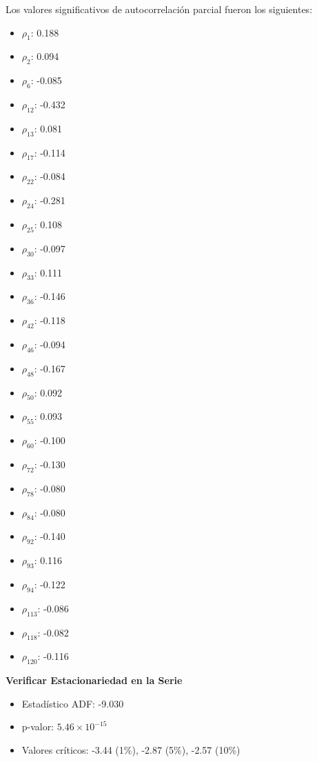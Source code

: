 \documentclass[12pt,letterpaper]{article}   %
\begin{document}
Los valores significativos de autocorrelación parcial fueron los siguientes:
\begin{multicols}{5}
\scriptsize
\begin{itemize}
    \item $\rho_1$: 0.188
    \item $\rho_2$: 0.094
    \item $\rho_6$: -0.085
    \item $\rho_{12}$: -0.432
    \item $\rho_{13}$: 0.081
    \item $\rho_{17}$: -0.114
    \item $\rho_{22}$: -0.084
    \item $\rho_{24}$: -0.281
    \item $\rho_{25}$: 0.108
    \item $\rho_{30}$: -0.097
    \item $\rho_{33}$: 0.111
    \item $\rho_{36}$: -0.146
    \item $\rho_{42}$: -0.118
    \item $\rho_{46}$: -0.094
    \item $\rho_{48}$: -0.167
    \item $\rho_{50}$: 0.092
    \item $\rho_{55}$: 0.093
    \item $\rho_{60}$: -0.100
    \item $\rho_{72}$: -0.130
    \item $\rho_{78}$: -0.080
    \item $\rho_{84}$: -0.080
    \item $\rho_{92}$: -0.140
    \item $\rho_{93}$: 0.116
    \item $\rho_{94}$: -0.122
    \item $\rho_{113}$: -0.086
    \item $\rho_{118}$: -0.082
    \item $\rho_{120}$: -0.116
\end{itemize}
\end{multicols}



\textbf{Verificar Estacionariedad en la Serie}



\begin{itemize}
    \item Estadístico ADF: -9.030
    \item p-valor: $5.46 \times 10^{-15}$
    \item Valores críticos: -3.44 (1\%), -2.87 (5\%), -2.57 (10\%)
\end{itemize}
\end{document}
